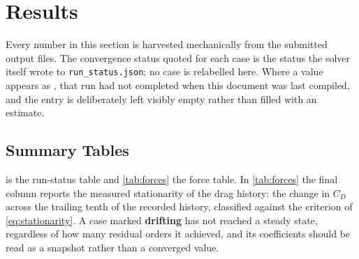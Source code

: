 \section{Results}
\label{sec:results}

Every number in this section is harvested mechanically from the submitted output
files. The convergence status quoted for each case is the status the solver itself
wrote to \texttt{run\_status.json}; no case is relabelled here. Where a value
appears as \pending, that run had not completed when this document was last
compiled, and the entry is deliberately left visibly empty rather than filled
with an estimate.

\subsection{Summary Tables}
\label{sec:summary}

 is the run-status table and \cref{tab:forces} the force
table. In \cref{tab:forces} the final column reports the measured stationarity of
the drag history: the change in $C_D$ across the trailing tenth of the recorded
history, classified against the criterion of \cref{eq:stationarity}. A case marked
\textbf{drifting} has not reached a steady state, regardless of how many residual
orders it achieved, and its coefficients should be read as a snapshot rather than
a converged value.

\begin{table}[htbp]
  \centering
  \caption{Run status for all eight required cases, transcribed from each
  \texttt{run\_status.json}. Physical time is zero for steady cases by
  construction. Wall time is for the rank count shown, under the 4-CPU container
  quota described in \cref{sec:quota}.}
  \label{tab:runstatus}
  \footnotesize
  
\end{table}

